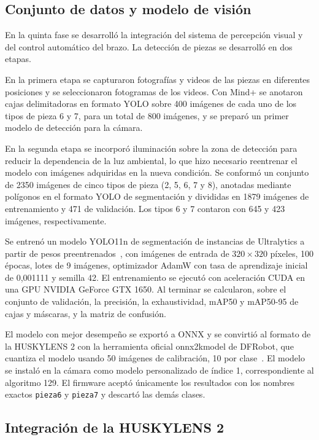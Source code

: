 \subsection{Conjunto de datos y modelo de visión}

En la quinta fase se desarrolló la integración del sistema de percepción visual y del control automático del brazo. La detección de piezas se desarrolló en dos etapas.

En la primera etapa se capturaron fotografías y videos de las piezas en diferentes posiciones y se seleccionaron fotogramas de los videos. Con Mind+ se anotaron cajas delimitadoras en formato YOLO sobre 400 imágenes de cada uno de los tipos de pieza 6 y 7, para un total de 800 imágenes, y se preparó un primer modelo de detección para la cámara.

En la segunda etapa se incorporó iluminación sobre la zona de detección para reducir la dependencia de la luz ambiental, lo que hizo necesario reentrenar el modelo con imágenes adquiridas en la nueva condición. Se conformó un conjunto de 2350 imágenes de cinco tipos de pieza (2, 5, 6, 7 y 8), anotadas mediante polígonos en el formato YOLO de segmentación y divididas en 1879 imágenes de entrenamiento y 471 de validación. Los tipos 6 y 7 contaron con 645 y 423 imágenes, respectivamente.

Se entrenó un modelo YOLO11n de segmentación de instancias de Ultralytics a partir de pesos preentrenados~\cite{jocher2024yolo11}, con imágenes de entrada de $320\times320$ píxeles, 100 épocas, lotes de 9 imágenes, optimizador AdamW con tasa de aprendizaje inicial de 0,001111 y semilla 42. El entrenamiento se ejecutó con aceleración CUDA en una GPU NVIDIA GeForce GTX 1650. Al terminar se calcularon, sobre el conjunto de validación, la precisión, la exhaustividad, mAP50 y mAP50-95 de cajas y máscaras, y la matriz de confusión.

El modelo con mejor desempeño se exportó a ONNX y se convirtió al formato de la HUSKYLENS 2 con la herramienta oficial onnx2kmodel de DFRobot, que cuantiza el modelo usando 50 imágenes de calibración, 10 por clase~\cite{dfrobotOnnx2kmodel}. El modelo se instaló en la cámara como modelo personalizado de índice 1, correspondiente al algoritmo 129. El firmware aceptó únicamente los resultados con los nombres exactos \texttt{pieza6} y \texttt{pieza7} y descartó las demás clases.


\subsection{Integración de la HUSKYLENS 2}

